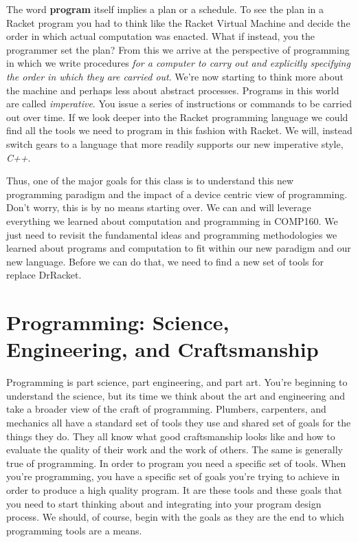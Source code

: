 \documentclass[]{tufte-handout}
\begin{document}
The word \textbf{program} itself implies a plan or a schedule. To see the plan in a Racket program you had to think like the Racket Virtual Machine and decide the order in which actual computation was enacted. What if instead, you the programmer set the plan? From this we arrive at the perspective of programming in which we write procedures \textit{for a computer to carry out and explicitly specifying the order in which they are carried out}.  We're now starting to think more about the machine and perhaps less  about abstract processes.  Programs in this world are called \textit{imperative}.  You issue a series of instructions or commands to be carried out over time.  If we look deeper into the Racket programming language we could find all the tools we need to program in this fashion with Racket.  We will, instead switch gears to a language that more readily supports our new imperative style, \textit{C++}. 

Thus, one of the major goals for this class is to understand this new programming paradigm and the impact of a device centric view of programming. Don't worry, this is by no means starting over.  We can and will leverage everything we learned about computation and programming in COMP160. We just need to revisit the fundamental ideas and programming methodologies we learned about programs and computation to fit within our new paradigm and our new language. Before we can do that, we need to find a new set of tools for replace DrRacket.


\section{Programming: Science, Engineering, and Craftsmanship}

Programming is part science, part engineering, and part art.  You're beginning to understand the science, but its time we think about the art and engineering and take a broader view of the craft of programming.  Plumbers, carpenters, and mechanics all have a standard set of tools they use and shared set of goals for the things they do.  They all know what good craftsmanship looks like and how to evaluate the quality of their work and the work of others. The same is generally true of programming. In order to program you need a specific set of tools. When you're programming, you have a specific set of goals you're trying to achieve in order to produce a high quality program. It are these tools and these goals that you need to start thinking about and integrating into your program design process.  We should, of course, begin with the goals as they are the end to which programming tools are a means.  
\end{document}
